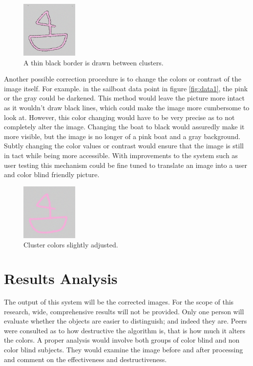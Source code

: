 \documentclass[12pt]{article}
\begin{document}
\begin{figure}[H]
	\centering
	\includegraphics[width=0.25\textwidth]{img/noise_data2_border.png}
	\caption{A thin black border is drawn between clusters.}
	\label{fig:border1}
\end{figure}

Another possible correction procedure is to change the colors or contrast of the image itself. For example. in the sailboat data point in figure \ref{fig:data1}, the pink or the gray could be darkened. This method would leave the picture more intact as it wouldn't draw black lines, which could make the image more cumbersome to look at. However, this color changing would have to be very precise as to not completely alter the image. Changing the boat to black would assuredly make it more visible, but the image is no longer of a pink boat and a gray background. Subtly changing the color values or contrast would ensure that the image is still in tact while being more accessible. With improvements to the system such as user testing this mechanism could be fine tuned to translate an image into a user and color blind friendly picture.


\begin{figure}[H]
	\centering
	\includegraphics[width=0.25\textwidth]{img/noise_data2_noise_corrected.png}
	\caption{Cluster colors slightly adjusted.}
	\label{fig:corrected1}
\end{figure}


\section{Results Analysis}


The output of this system will be the corrected images. For the scope of this research, wide, comprehensive results will not be provided. Only one person will evaluate whether the objects are easier to distinguish; and indeed they are. Peers were consulted  as to how destructive the algorithm is, that is how much it alters the colors. A proper analysis would involve both groups of color blind and non color blind subjects. They would examine the image before and after processing and comment on the effectiveness and destructiveness. 
\end{document}
